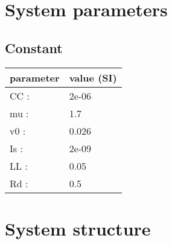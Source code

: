 \documentclass[11pt, oneside]{article}      %
\begin{document}
\section{System parameters}
%
%
\subsection{Constant}
%
\begin{center}
%
\begin{tabular}{ll}
%
\hline
parameter & value (SI)
\\ \hline
CC :& 2e-06
\\
mu :& 1.7
\\
v0 :& 0.026
\\
Is :& 2e-09
\\
LL :& 0.05
\\
Rd :& 0.5
\\
\hline
\end{tabular}
%
\end{center}
%
\section{System structure}
%
\end{document}

